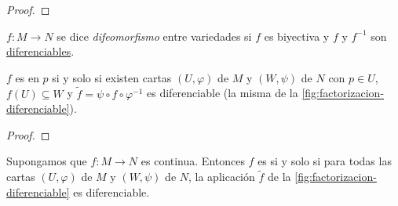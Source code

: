 \documentclass[../VD.tex]{subfiles}
\begin{document}
\begin{proof}
\end{proof}

\begin{definition}[difeomorfismo]
  \label{def:difeomorfismo}
  \(f \colon M \to N\) se dice \emph{difeomorfismo} entre variedades si \(f\) es
  biyectiva y \(f\) y \(f^{-1}\) son \hyperref[def:diferenciable]{diferenciables}.
\end{definition}

\begin{lemma}
  \(f\) es  en \(p\) si y solo si existen cartas
  \((U,\varphi)\) de \(M\) y \((W,\psi)\) de \(N\) con \(p \in U\), \(f(U)
  \subseteq W\) y \(\widetilde{f} = \psi \circ f \circ \varphi^{-1}\) es
  diferenciable (la misma de la \cref{fig:factorizacion-diferenciable}).
\end{lemma}

\begin{proof}
\end{proof}

\begin{lemma}
  Supongamos que \(f \colon M \to N\) es continua. Entonces \(f\) es
   si y solo si para todas las cartas \((U,\varphi)\)
  de \(M\) y \((W,\psi)\) de \(N\), la aplicación \(\widetilde{f}\) de la
  \cref{fig:factorizacion-diferenciable} es diferenciable.
\end{lemma}
\end{document}
